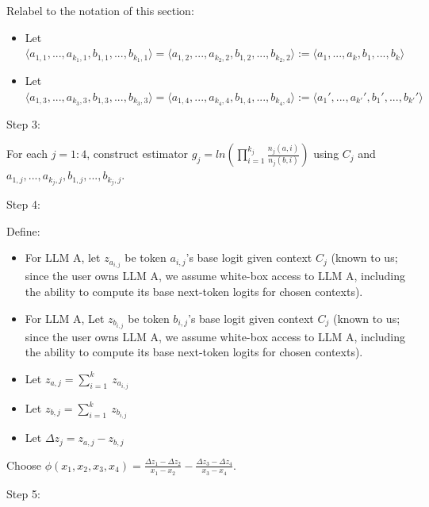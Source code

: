 \documentclass{article}
\begin{document}
Relabel to the notation of this section:
\begin{itemize}
\item Let $\displaystyle \langle a_{1,1} ,...,a_{k_{1} ,1} ,b_{1,1} ,...,b_{k_{1} ,1} \rangle =\langle a_{1,2} ,...,a_{k_{2} ,2} ,b_{1,2} ,...,b_{k_{2} ,2} \rangle :=\langle a_{1} ,...,a_{k} ,b_{1} ,...,b_{k} \rangle $
\item Let $\displaystyle \langle a_{1,3} ,...,a_{k_{3} ,3} ,b_{1,3} ,...,b_{k_{3} ,3} \rangle =\langle a_{1,4} ,...,a_{k_{4} ,4} ,b_{1,4} ,...,b_{k_{4} ,4} \rangle :=\langle a_{1} ',...,a_{k'} ',b_{1} ',...,b_{k'} '\rangle $
\end{itemize}



Step 3:

For each $\displaystyle j=1:4$, construct estimator $\displaystyle g_{j} =ln\left(\prod _{i=1}^{k_{j}}\frac{n_{j}\left( a,i\right)}{n_{j}\left( b,i\right)}\right)$ using $\displaystyle C_{j}$ and $\displaystyle a_{1,j} ,...,a_{k_{j} ,j} ,b_{1,j} ,...,b_{k_{j} ,j}$.



Step 4:

Define:
\begin{itemize}
\item For LLM A, let $\displaystyle z_{a_{i,j}}$ be token $\displaystyle a_{i,j}$'s base logit given context $\displaystyle C_{j}$ (known to us; since the user owns LLM A, we assume white-box access to LLM A, including the ability to compute its base next-token logits for chosen contexts).
\item For LLM A, Let $\displaystyle z_{b_{i,j}}$ be token $\displaystyle b_{i,j}$'s base logit given context $\displaystyle C_{j}$ (known to us; since the user owns LLM A, we assume white-box access to LLM A, including the ability to compute its base next-token logits for chosen contexts).
\item Let $\displaystyle z_{a,j} =\sum _{i=1}^{k} \ z_{a_{i,j}}$
\item Let $\displaystyle z_{b,j} =\sum _{i=1}^{k} \ z_{b_{i,j}}$
\item Let $\displaystyle \Delta z_{j} =z_{a,j} -z_{b,j}$
\end{itemize}

Choose $\displaystyle \phi \left( x_{1} ,x_{2} ,x_{3} ,x_{4}\right) =\frac{\Delta z_{1} -\Delta z_{2}}{x_{1} -x_{2}} -\frac{\Delta z_{3} -\Delta z_{4}}{x_{3} -x_{4}}$.



Step 5:
\end{document}
